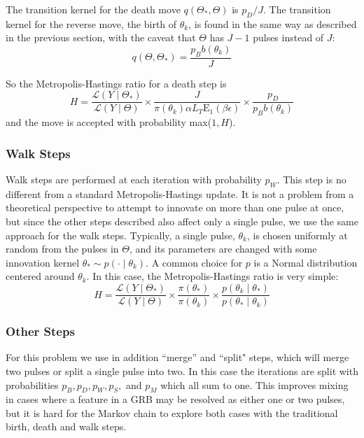 \documentclass[iop,onecolumn]{emulateapj}
\newcommand{\Eone}{{\ensuremath{\mathrm{E}_1}}}
\begin{document}
The transition kernel for the death move $q(\Theta_*, \Theta)$ is $p_D/J$. The transition kernel for the reverse move, the birth of $\theta_k$, is found in the same way as described in the previous section, with the caveat that $\Theta$ has $J-1$ pulses instead of $J$:
\[ q(\Theta, \Theta_*) = \frac{p_B  b(\theta_k)}{ J} \]

So the Metropolis-Hastings ratio for a death step is
\begin{equation}
 H = \frac{\mathcal{L}(Y \mid \Theta_* )}{\mathcal{L}(Y \mid \Theta )}
     \times \frac{J}{\pi(\theta_k) \alpha L_T  \Eone(\beta \epsilon)} 
     \times \frac{p_D}{p_B b(\theta_k)}
\end{equation}
and the move is accepted with probability max($1,H$).
\subsubsection{Walk Steps}
Walk steps are performed at each iteration with probability $p_W$. This step is no different from a standard Metropolis-Hastings update.  It is not a problem from a theoretical perspective to attempt to innovate on more than one pulse at once, but since the other steps described also affect only a single pulse, we use the same approach for the walk steps. Typically, a single pulse, $\theta_k$, is chosen uniformly at random from the pulses in $\Theta$, and its parameters are changed with some innovation kernel $\theta_* \sim p(\cdot\mid \theta_k )$. A common choice for $p$ is a Normal distribution centered around $\theta_k$. In this case, the Metropolis-Hastings ratio is very simple:
\begin{equation}
 H = \frac{\mathcal{L}(Y \mid \Theta_* )}{\mathcal{L}(Y \mid \Theta )} 
     \times \frac{\pi(\theta_*)}{\pi(\theta_k)}
     \times \frac{p(\theta_k \mid \theta_*)}{p(\theta_* \mid  \theta_k)}
\end{equation}


\subsubsection{Other Steps}

    For this problem we use in addition  ``merge'' and ``split" steps, which will merge two pulses or split a single pulse into two. In this case the iterations are split with probabilities $p_B, p_D, p_W, p_S,$ and $p_M$ which all sum to one. This improves mixing in cases where a feature in a GRB may be resolved as either one or two pulses, but it is hard for the Markov chain to explore both cases with the traditional birth, death and walk steps.
\end{document}
